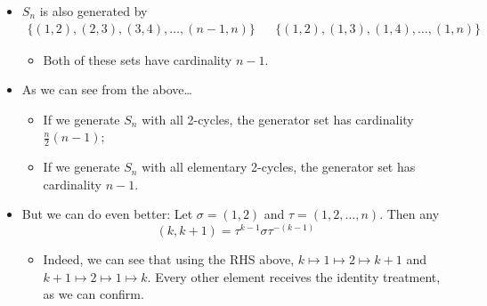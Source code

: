 \documentclass[../notes.tex]{subfiles}
\begin{document}
\begin{itemize}
\begin{proof}
\begin{figure}[H]
            \caption{Generating $S_n$ with 2-cycles.}
            \label{fig:SnGenerate2}
        \end{figure}
        The idea is we fix the first element and then work down the list.
    \end{proof}
    \item $S_n$ is also generated by
    \begin{align*}
        \{(1,2),(2,3),(3,4),\dots,(n-1,n)\}&&
        \{(1,2),(1,3),(1,4),\dots,(1,n)\}
    \end{align*}
    \begin{itemize}
        \item Both of these sets have cardinality $n-1$.
    \end{itemize}
    \item As we can see from the above\dots
    \begin{itemize}
        \item If we generate $S_n$ with all 2-cycles, the generator set has cardinality $\frac{n}{2}(n-1)$;
        \item If we generate $S_n$ with all elementary 2-cycles, the generator set has cardinality $n-1$.
    \end{itemize}
    \item But we can do even better: Let $\sigma=(1,2)$ and $\tau=(1,2,\dots,n)$. Then any
    \begin{equation*}
        (k,k+1) = \tau^{k-1}\sigma\tau^{-(k-1)}
    \end{equation*}
    \begin{itemize}
        \item Indeed, we can see that using the RHS above, $k\mapsto 1\mapsto 2\mapsto k+1$ and $k+1\mapsto 2\mapsto 1\mapsto k$. Every other element receives the identity treatment, as we can confirm.
    \end{itemize}
\end{itemize}
\end{document}
